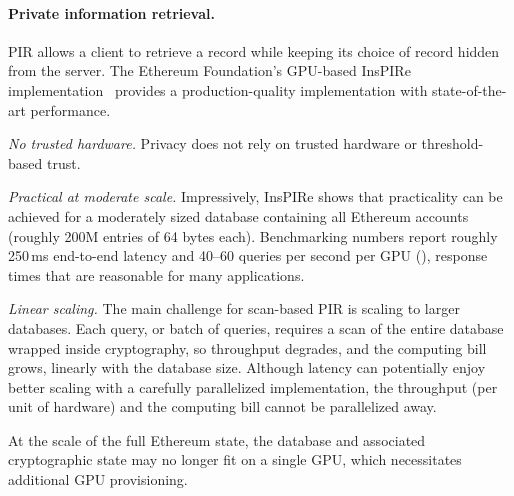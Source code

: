 \paragraph{Private information retrieval.}
PIR allows a client to retrieve a record while keeping its choice of record
hidden from the server. The Ethereum Foundation's GPU-based InsPIRe
implementation~\cite{efinspire} provides a production-quality implementation
with state-of-the-art performance.
\begin{pros}
\item \emph{No trusted hardware.} Privacy does not rely on trusted hardware
or threshold-based trust. 
\item \emph{Practical at moderate scale.} Impressively, InsPIRe shows that
  practicality can be achieved for a moderately sized database containing
  all Ethereum accounts (roughly 200M entries of 64 bytes each).
  Benchmarking numbers report roughly 250\,ms end-to-end latency and
  40--60 queries per second per GPU (), response times
  that are reasonable for many applications.
\end{pros}
\begin{cons}
\item \emph{Linear scaling.} The main challenge for scan-based PIR is
  scaling to larger databases. Each query, or batch of queries, requires a
  scan of the entire database wrapped inside cryptography, so throughput
  degrades, and the computing bill grows, linearly with the database size.
  Although latency can potentially enjoy better scaling with a carefully
  parallelized implementation, the throughput (per unit of hardware) and
  the computing bill cannot be parallelized away.

At the scale of the full Ethereum state, the
  database and associated cryptographic state may no longer fit on a single
  GPU, which necessitates additional GPU provisioning.
\end{cons}

\begingroup
{}
